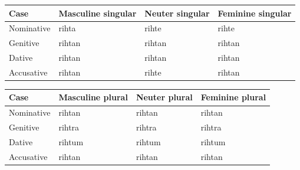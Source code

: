 \par\begingroup
\fontsize{10.5}{13.2}\selectfont
\setlength{\LTleft}{0pt}\setlength{\LTright}{\fill}
\noindent
\begin{tabular}{@{}>{\raggedright\arraybackslash}p{22.0mm}>{\raggedright\arraybackslash}p{31.188mm}>{\raggedright\arraybackslash}p{31.188mm}>{\raggedright\arraybackslash}p{31.188mm}@{}}
\toprule
\textbf{Case} & \textbf{Masculine singular} & \textbf{Neuter singular} & \textbf{Feminine singular} \\
\midrule
Nominative & rihta & rihte & rihte \\
Genitive & rihtan & rihtan & rihtan \\
Dative & rihtan & rihtan & rihtan \\
Accusative & rihtan & rihte & rihtan \\
\bottomrule
\end{tabular}
\par\endgroup
\par\addvspace{5pt}
\par\begingroup
\fontsize{10.5}{13.2}\selectfont
\setlength{\LTleft}{0pt}\setlength{\LTright}{\fill}
\noindent
\begin{tabular}{@{}>{\raggedright\arraybackslash}p{22.0mm}>{\raggedright\arraybackslash}p{31.188mm}>{\raggedright\arraybackslash}p{31.188mm}>{\raggedright\arraybackslash}p{31.188mm}@{}}
\toprule
\textbf{Case} & \textbf{Masculine plural} & \textbf{Neuter plural} & \textbf{Feminine plural} \\
\midrule
Nominative & rihtan & rihtan & rihtan \\
Genitive & rihtra & rihtra & rihtra \\
Dative & rihtum & rihtum & rihtum \\
Accusative & rihtan & rihtan & rihtan \\
\bottomrule
\end{tabular}
\par\endgroup

